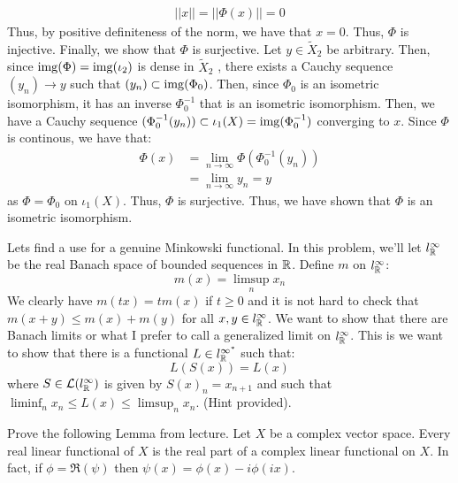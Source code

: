 \documentclass[12pt]{article}
\begin{document}
\begin{solution}
    \begin{align*}
        ||x|| = ||\Phi(x)|| = 0
    \end{align*}
    Thus, by positive definiteness of the norm, we have that $x = 0$. Thus, $\Phi$ is injective. \bbni
    Finally, we show that $\Phi$ is surjective. Let $y \in \tilde{X}_2$ be arbitrary. Then, since $\operatorname{img}(\Phi) = \operatorname{img}(\iota_2)$ is dense in $\tilde{X}_2$ , there exists a Cauchy sequence $(y_n) \to y$ such that $(y_n) \subset \operatorname{img}(\Phi_0)$. Then, since $\Phi_0$ is an isometric isomorphism, it has an inverse $\Phi_0^{-1}$ that is an isometric isomorphism. Then, we have a Cauchy sequence $(\Phi_0^{-1}(y_n)) \subset \iota_1(X) = \operatorname{img}(\Phi_0^{-1})$ converging to $x$. Since $\Phi$ is continous, we have that:
    \begin{align*}
        \Phi(x) &= \lim_{n \to \infty} \Phi(\Phi_0^{-1}(y_n)) \\
        &= \lim_{n \to \infty} y_n = y
    \end{align*}
    as $\Phi = \Phi_0$ on $\iota_1(X)$. Thus, $\Phi$ is surjective. \bbni
    Thus, we have shown that $\Phi$ is an isometric isomorphism. \bbni
\end{solution}
\newpage 

\begin{problem}{39}
    Lets find a use for a genuine Minkowski functional. In this problem, we'll let $l_\mathbb R^\infty$ be the real Banach space of bounded sequences in $\mathbb R$. Define $m$ on $l_\mathbb R^\infty$: 
    \[ m(x) = \limsup_n x_n\]
    We clearly have $m(tx) = tm(x)$ if $t \geq 0$ and it is not hard to check that $m(x+y) \leq m(x) + m(y)$ for all $x, y \in l_\mathbb R^\infty$. We want to show that there are Banach limits or what I prefer to call a generalized limit on $l_\mathbb R^\infty$. This is we want to show that there is a functional $L \in l_\mathbb R^{\infty^*}$ such that:
    \[ L(S(x)) = L(x)\] 
    where $S \in \mathcal{L}(l_\mathbb R^\infty)$ is given by $S(x)_n = x_{n+1}$ and such that $\liminf_n x_n \leq L(x) \leq \limsup_n x_n$. (Hint provided).
\end{problem}
\begin{solution} 

\end{solution}
\newpage 

\begin{problem}{40}
    Prove the following Lemma from lecture. Let $X$ be a complex vector space. Every real linear functional of $X$ is the real part of a complex linear functional on $X$. In fact, if $\phi = \Re(\psi)$ then $\psi(x) = \phi(x) - i\phi(ix)$. 
\end{problem}
\begin{solution} 

\end{solution}
\newpage 
\end{document}
